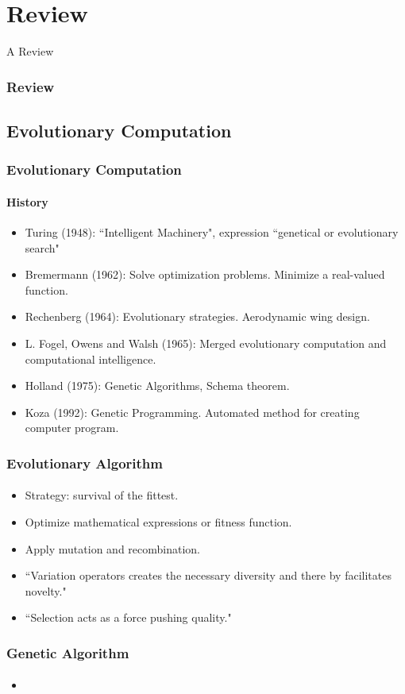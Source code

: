 \section{Review}

\frame
{
	\begin{center}
		\LARGE A Review
	\end{center}
}

\frame
{
	\frametitle{Review}
}

\subsection{Evolutionary Computation}

\frame
{
	\frametitle{Evolutionary Computation}
	\framesubtitle{History}

	\begin{itemize}
		\item Turing (1948): ``Intelligent Machinery", expression ``genetical or evolutionary search"
		\item Bremermann (1962): Solve optimization problems. Minimize a real-valued function.
		\item Rechenberg (1964): Evolutionary strategies. Aerodynamic wing design.
		\item L. Fogel, Owens and Walsh (1965): Merged evolutionary computation and computational intelligence.
		\item Holland (1975): Genetic Algorithms, Schema theorem.
		\item Koza (1992): Genetic Programming. Automated method for creating computer program.
	\end{itemize}
}

\frame
{
	\frametitle{Evolutionary Algorithm}
	\framesubtitle{}

	\begin{itemize}
		\item Strategy: survival of the fittest.
		\item Optimize mathematical expressions or fitness function.
		\item Apply mutation and recombination.
		\item ``Variation operators creates the necessary diversity and there by facilitates novelty."
		\item ``Selection acts as a force pushing quality."
	\end{itemize}
}

\frame
{
	\frametitle{Genetic Algorithm}
	\framesubtitle{}

	\begin{itemize}
		\item 
	\end{itemize}
}

